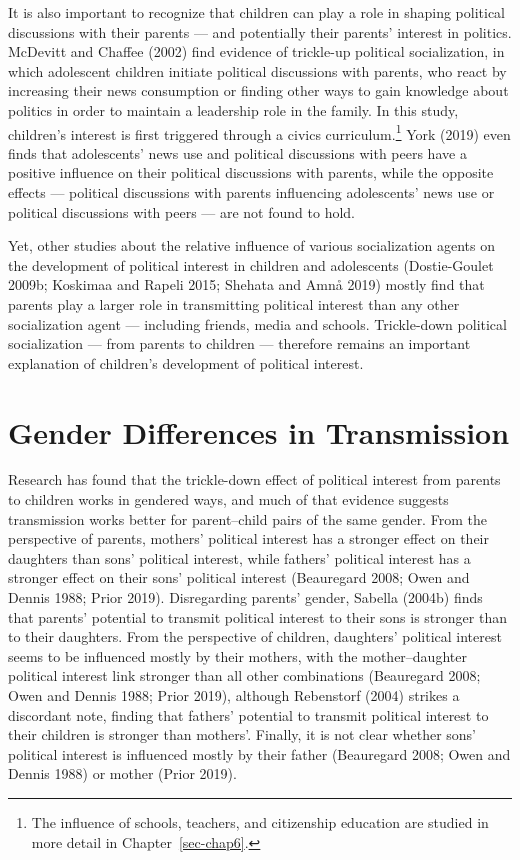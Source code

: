 \documentclass[
  letterpaper,
  DIV=11,
  numbers=noendperiod]{scrreprt}
\begin{document}
It is also important to recognize that children can play a role in
shaping political discussions with their parents --- and potentially
their parents' interest in politics. McDevitt and Chaffee (2002) find
evidence of trickle-up political socialization, in which adolescent
children initiate political discussions with parents, who react by
increasing their news consumption or finding other ways to gain
knowledge about politics in order to maintain a leadership role in the
family. In this study, children's interest is first triggered through a
civics curriculum.\footnote{The influence of schools, teachers, and
  citizenship education are studied in more detail in
  Chapter~\ref{sec-chap6}.} York (2019) even finds that adolescents'
news use and political discussions with peers have a positive influence
on their political discussions with parents, while the opposite effects
--- political discussions with parents influencing adolescents' news use
or political discussions with peers --- are not found to hold.

Yet, other studies about the relative influence of various socialization
agents on the development of political interest in children and
adolescents (Dostie-Goulet 2009b; Koskimaa and Rapeli 2015; Shehata and
Amnå 2019) mostly find that parents play a larger role in transmitting
political interest than any other socialization agent --- including
friends, media and schools. Trickle-down political socialization ---
from parents to children --- therefore remains an important explanation
of children's development of political interest.

\hypertarget{gender-differences-in-transmission}{%
\section{Gender Differences in
Transmission}\label{gender-differences-in-transmission}}

Research has found that the trickle-down effect of political interest
from parents to children works in gendered ways, and much of that
evidence suggests transmission works better for parent--child pairs of
the same gender. From the perspective of parents, mothers' political
interest has a stronger effect on their daughters than sons' political
interest, while fathers' political interest has a stronger effect on
their sons' political interest (Beauregard 2008; Owen and Dennis 1988;
Prior 2019). Disregarding parents' gender, Sabella (2004b) finds that
parents' potential to transmit political interest to their sons is
stronger than to their daughters. From the perspective of children,
daughters' political interest seems to be influenced mostly by their
mothers, with the mother--daughter political interest link stronger than
all other combinations (Beauregard 2008; Owen and Dennis 1988; Prior
2019), although Rebenstorf (2004) strikes a discordant note, finding
that fathers' potential to transmit political interest to their children
is stronger than mothers'. Finally, it is not clear whether sons'
political interest is influenced mostly by their father (Beauregard
2008; Owen and Dennis 1988) or mother (Prior 2019).
\end{document}
